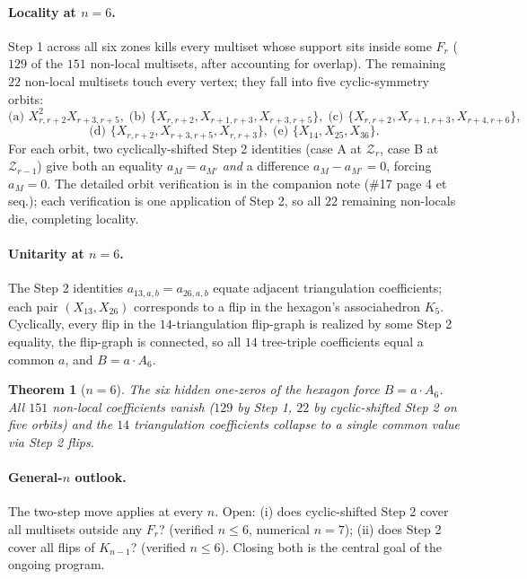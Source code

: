 \documentclass[11pt]{article}
\newtheorem{theorem}{Theorem}
\newcommand{\Zr}{\mathcal{Z}}
\newcommand{\Fr}{F}
\begin{document}
\paragraph{Locality at $n=6$.}  Step 1 across all six zones kills
every multiset whose support sits inside some $\Fr_r$ ($129$ of
the $151$ non-local multisets, after accounting for overlap).  The
remaining $22$ non-local multisets touch every vertex; they fall
into five cyclic-symmetry orbits:
\[
\text{(a) } X_{r,r+2}^2 X_{r+3,r+5},\;
\text{(b) } \{X_{r,r+2}, X_{r+1,r+3}, X_{r+3,r+5}\},\;
\text{(c) } \{X_{r,r+2}, X_{r+1,r+3}, X_{r+4,r+6}\},\;
\]
\[
\text{(d) } \{X_{r,r+2}, X_{r+3,r+5}, X_{r,r+3}\},\;
\text{(e) } \{X_{14}, X_{25}, X_{36}\}.
\]
For each orbit, two cyclically-shifted Step 2 identities (case A
at $\Zr_r$, case B at $\Zr_{r-1}$) give both an equality
$a_M = a_{M'}$ \emph{and} a difference $a_M - a_{M'} = 0$, forcing
$a_M = 0$.  The detailed orbit verification is in the companion
note (\#17 page 4 et seq.); each verification is one application
of Step 2, so all $22$ remaining non-locals die, completing
locality.

\paragraph{Unitarity at $n=6$.}  The Step 2 identities
$a_{13,a,b}=a_{26,a,b}$ equate adjacent triangulation coefficients;
each pair $(X_{13},X_{26})$ corresponds to a flip in the hexagon's
associahedron $K_5$.  Cyclically, every flip in the
$14$-triangulation flip-graph is realized by some Step 2 equality,
the flip-graph is connected, so all $14$ tree-triple coefficients
equal a common $a$, and $B=a\cdot A_6$.

\begin{theorem}[$n=6$]\label{thm:n6}
The six hidden one-zeros of the hexagon force $B=a\cdot A_6$.  All
$151$ non-local coefficients vanish ($129$ by Step 1, $22$ by
cyclic-shifted Step 2 on five orbits) and the $14$ triangulation
coefficients collapse to a single common value via Step 2 flips.
\end{theorem}

\paragraph{General-$n$ outlook.}  The two-step move applies at every
$n$.  Open: (i) does cyclic-shifted Step 2 cover all multisets
outside any $\Fr_r$? (verified $n\le 6$, numerical $n=7$);
(ii) does Step 2 cover all flips of $K_{n-1}$? (verified $n\le 6$).
Closing both is the central goal of the ongoing program.
\end{document}
